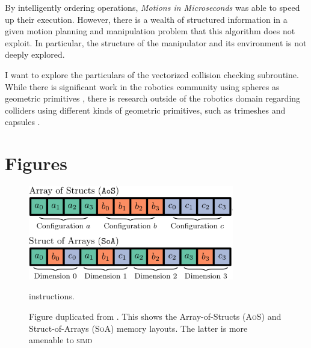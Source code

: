 \documentclass{article}
\newcommand{\todo}[1]{\textbf{\color{red}#1}}
\begin{document}
By intelligently ordering operations, \textit{Motions in Microseconds} was able to speed up their execution. However, there is a wealth of structured information in a given motion planning and manipulation problem that this algorithm does not exploit. In particular, the structure of the manipulator and its environment is not deeply explored.

I want to explore the particulars of the vectorized collision checking subroutine. While there is significant work in the robotics community using spheres as geometric primitives \cite{paper:cuRobo}, there is research outside of the robotics domain regarding colliders using different kinds of geometric primitives, such as trimeshes and capsules \cite{web:UE_cols}. 


\section{Figures}

\begin{figure}[h]
\includegraphics[width=0.8\textwidth]{./assets/soa_aos.png}
\caption{Figure duplicated from \cite{paper:MiM}. This shows the Array-of-Structs (\textsc{AoS}) and Struct-of-Arrays (\textsc{SoA}) memory layouts. The latter is more amenable to \textsc{simd}} instructions.
\label{fig:soa_aos}
\end{figure}
\end{document}
